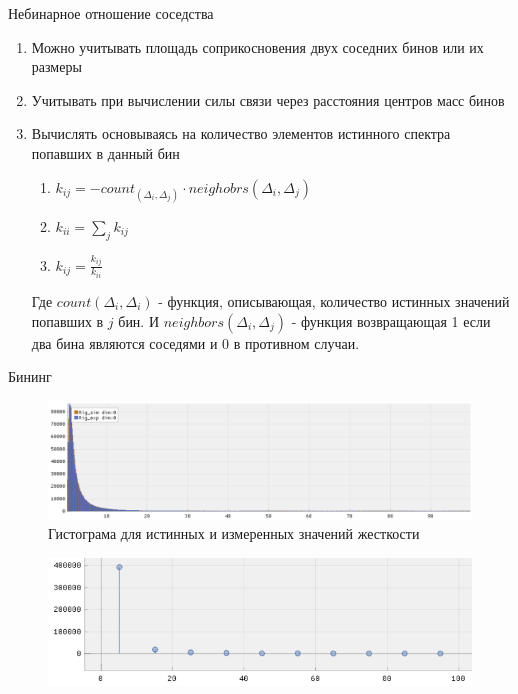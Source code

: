 \documentclass[fullscreen=true,russian,compress,%
	hyperref={unicode,bookmarks=false}]{presentation}
\begin{document}
\begin{frame}{Небинарное отношение соседства}
   \begin{enumerate}
      \item Можно учитывать площадь соприкосновения двух соседних бинов или их размеры
      \item Учитывать при вычислении силы связи через расстояния центров масс бинов
      \item Вычислять основываясь на количество элементов истинного спектра попавших в данный бин
      \begin{enumerate}
         \item  $k_{ij} = - count_(\Delta_{i}, \Delta_{j}) \cdot neighobrs(\Delta_{i}, \Delta_{j})$ \\
         \item  $k_{ii} = \displaystyle\sum_{j} k_{ij}$ \\
         \item  $k_{ij} = \frac{k_{ij}}{k_{ii}}$
      \end{enumerate}
      Где $count(\Delta_{i}, \Delta_{i})$ - функция, описывающая, количество истинных значений попавших в $j$ бин. 
      И $neighbors(\Delta_{i}, \Delta_{j})$ - функция возвращающая 1 если два бина являются соседями и 0 в противном случаи.
   \end{enumerate}
\end{frame}


\begin{frame}{Бининг}
   \begin{figure}[h!]
      \centering
      \includegraphics[width=\linewidth]{images/rig_dist.png}
      \caption{Гистограма для истинных и измеренных значений жесткости}
      \label{photo:rig_dist}
   \end{figure}
   \begin{figure}[h!]
      \centering
      \includegraphics[scale=0.55]{images/rig_static_binning.png}
   \end{figure}
\end{frame}
\end{document}
